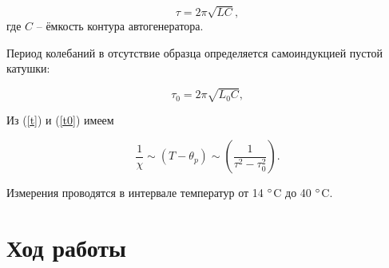 \documentclass[a4paper, 12pt]{article}
\begin{document}
\begin{equation}
\label{t}
\tau = 2\pi\sqrt{LC},
\end{equation}
где $C$ -- ёмкость контура автогенератора.

Период колебаний в отсутствие образца определяется самоиндукцией пустой катушки:

\begin{equation}
\label{t0}
\tau_0 = 2\pi\sqrt{L_0C},
\end{equation}

Из (\ref{t}) и (\ref{t0}) имеем

\begin{equation}
\label{Соотношение}
\frac{1}{\chi}\sim(T-\theta_p)\sim\left(\frac{1}{\tau^2-\tau_0^2}\right).
\end{equation}

Измерения проводятся в интервале температур от 14 $\degree$C до 40 $\degree$C.

\section{Ход работы}
\end{document}
